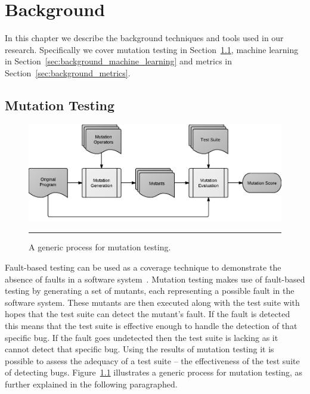 \chapter{Background}
\label{chap:background}
In this chapter we describe the background techniques and tools used in our research. Specifically we cover mutation testing in Section~\ref{sec:background_mutation_testing}, machine learning in Section~\ref{sec:background_machine_learning} and metrics in Section~\ref{sec:background_metrics}.


\section{Mutation Testing}
\label{sec:background_mutation_testing}
\begin{figure}[ht!]
  \centering
  \includegraphics[width=14cm]{figures/mutation_testing_overview.pdf}
  \caption{A generic process for mutation testing.}
  \label{fig:mutation_testing_overview}
  \vspace{2mm}
  \hrule
\end{figure}

Fault-based testing can be used as a coverage technique to demonstrate the absence of faults in a software system~\cite{DLS78, BSLS80}. Mutation testing makes use of fault-based testing by generating a set of mutants, each representing a possible fault in the software system. These mutants are then executed along with the test suite with hopes that the test suite can detect the mutant's fault. If the fault is detected this means that the test suite is effective enough to handle the detection of that specific bug. If the fault goes undetected then the test suite is lacking as it cannot detect that specific bug. Using the results of mutation testing it is possible to assess the adequacy of a test suite -- the effectiveness of the test suite of detecting bugs. Figure~\ref{fig:mutation_testing_overview} illustrates a generic process for mutation testing, as further explained in the following paragraphed.

